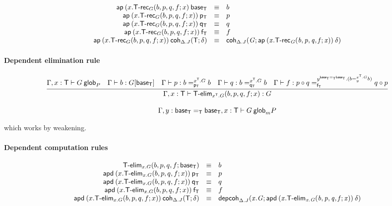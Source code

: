\begin{small}
  \[
  \begin{array}{rcl}
    \mathsf{ap} \: {(x.\mathsf{T\text{-}rec}_G(b, p, q, f; x)} \: {\mathsf{base_T}} & \equiv & b\\
    \mathsf{ap} \: {(x.\mathsf{T\text{-}rec}_G(b, p, q, f; x))} \: {\mathsf{p_T}} & \equiv & p\\
    \mathsf{ap} \: {(x.\mathsf{T\text{-}rec}_G(b, p, q, f; x))} \: {\mathsf{q_T}} & \equiv & q\\
    \mathsf{ap} \: {(x.\mathsf{T\text{-}rec}_G(b, p, q, f; x))} \: {\mathsf{f_T}} & \equiv & f\\
    \mathsf{ap} \: {(x.\mathsf{T\text{-}rec}_G(b, p, q, f; x))} \: {\mathsf{coh}_{\Delta.J} \mathit{(\mathsf{T};\delta)}} & \equiv &
    \mathsf{coh}_{\Delta.J} \mathit{(G;\mathsf{ap} \: {(x.\mathsf{T\text{-}rec}_G(b, p, q, f; x))} \: {\delta})}
  \end{array}
  \]
\end{small}

\paragraph{Dependent elimination rule}

\begin{small}
  \[
  \infer{\ofglob{\Gamma,x:\dsd{T}}{\dsd{T\text{-}elim}_{x^\dsd{T}.G}
      (b, p, q, f; x)}{G}}
  {\wfglob{\Gamma,x:\dsd{T}}{G}{P}
    & \ofglob{\Gamma}{b}{G[\baseT]}
    & \ofglob{\Gamma}{p}{\dhomj{x^{\dsd{T}}.G}{b}{b}{\pT}}
    & \ofglob{\Gamma}{q}{\dhomj{x^{\dsd{T}}.G}{b}{b}{\qT}}
    & \ofglob{\Gamma}{f}{\dhomj{y^{\homj{\dsd{T}}{\baseT}{\baseT}}.(\dhomj{x^{\dsd{T}}.G}{b}{b}{y})}
      {p\circ q}{q \circ p}{\fT}}}
  \]
\end{small}

\[{\Gamma,y:\mathsf{base_T} =_{\mathsf{T}} \mathsf{base_T},x:\mathsf{T}} \vdash {G} \: \mathsf{glob}_{m}{P}\]

which works by weakening.


\paragraph{Dependent computation rules}

\[
\begin{array}{rcl}
\mathsf{T\text{-}elim}_{x.G}(b, p, q, f; \mathsf{base_T}) & \equiv & b \\
\mathsf{apd} \: {(x.\mathsf{T\text{-}elim}_{x.G}(b, p, q, f; x))} \: {\mathsf{p_T}} & \equiv & p\\
\mathsf{apd} \: {(x.\mathsf{T\text{-}elim}_{x.G}(b, p, q, f; x))} \: {\mathsf{q_T}} & \equiv & q\\
\mathsf{apd} \: {(x.\mathsf{T\text{-}elim}_{x.G}(b, p, q, f; x))} \: {\mathsf{f_T}} & \equiv & f\\
\mathsf{apd} \: {(x.\mathsf{T\text{-}elim}_{x.G}(b, p, q, f; x))} \: {\mathsf{coh}_{\Delta.J} \mathit{(\mathsf{T};\delta)}} & \equiv &
\mathsf{depcoh}_{\Delta.J} \mathit{(x.G;\mathsf{apd} \: {(x.\mathsf{T\text{-}elim}_{x.G}(b, p, q, f; x))} \: {\delta})}
\end{array}
\]

